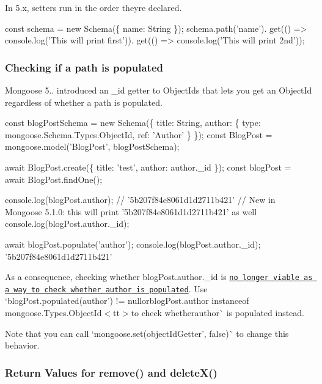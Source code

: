 In 5.\+x, setters run in the order they\textquotesingle{}re declared.


\begin{DoxyCode}
const schema = new Schema(\{ name: String \});
schema.path('name').
  get(() => console.log('This will print first')).
  get(() => console.log('This will print 2nd'));
\end{DoxyCode}


\subsubsection*{Checking if a path is populated}

Mongoose 5.. introduced an {\ttfamily \+\_\+id} getter to Object\+Ids that lets you get an Object\+Id regardless of whether a path is populated.


\begin{DoxyCode}
const blogPostSchema = new Schema(\{
  title: String,
  author: \{
    type: mongoose.Schema.Types.ObjectId,
    ref: 'Author'
  \}
\});
const BlogPost = mongoose.model('BlogPost', blogPostSchema);

await BlogPost.create(\{ title: 'test', author: author.\_id \});
const blogPost = await BlogPost.findOne();

console.log(blogPost.author); // '5b207f84e8061d1d2711b421'
// New in Mongoose 5.1.0: this will print '5b207f84e8061d1d2711b421' as well
console.log(blogPost.author.\_id);

await blogPost.populate('author');
console.log(blogPost.author.\_id); '5b207f84e8061d1d2711b421'
\end{DoxyCode}


As a consequence, checking whether {\ttfamily blog\+Post.\+author.\+\_\+id} is \href{https://github.com/Automattic/mongoose/issues/6415#issuecomment-388579185}{\tt no longer viable as a way to check whether {\ttfamily author} is populated}. Use `blog\+Post.\+populated(\textquotesingle{}author') != null{\ttfamily or}blog\+Post.\+author instanceof mongoose.\+Types.\+Object\+Id$<$tt$>$to check whetherauthor\`{} is populated instead.

Note that you can call `mongoose.\+set(\textquotesingle{}object\+Id\+Getter', false)\`{} to change this behavior.

\subsubsection*{Return Values for {\ttfamily remove()} and {\ttfamily delete\+X()}}

